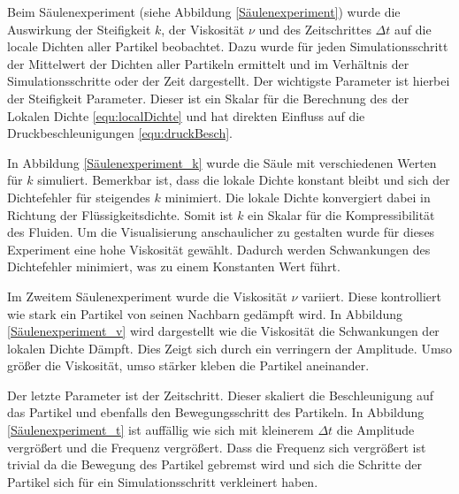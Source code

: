 \documentclass[a4paper, 12pt]{article}
\begin{document}
Beim Säulenexperiment (siehe Abbildung \ref{Säulenexperiment}) wurde die Auswirkung der Steifigkeit $k$, der Viskosität $\nu$ und des Zeitschrittes $\Delta t$ auf die locale Dichten aller Partikel beobachtet. Dazu wurde für jeden Simulationsschritt der Mittelwert der Dichten aller Partikeln ermittelt und im Verhältnis der Simulationsschritte oder der Zeit dargestellt. Der wichtigste Parameter ist hierbei der Steifigkeit Parameter. Dieser ist ein Skalar für die Berechnung des der Lokalen Dichte \eqref{equ:localDichte} und hat direkten Einfluss auf die Druckbeschleunigungen \eqref{equ:druckBesch}. 

In Abbildung \ref{Säulenexperiment_k} wurde die Säule mit verschiedenen Werten für $k$ simuliert. Bemerkbar ist, dass die lokale Dichte konstant bleibt und sich der Dichtefehler für steigendes $k$ minimiert. Die lokale Dichte konvergiert dabei in Richtung der Flüssigkeitsdichte. Somit ist $k$ ein Skalar für die Kompressibilität des Fluiden.
Um die Visualisierung anschaulicher zu gestalten wurde für dieses Experiment eine hohe Viskosität gewählt. Dadurch werden Schwankungen des Dichtefehler minimiert, was zu einem Konstanten Wert führt. 

Im Zweitem Säulenexperiment wurde die Viskosität $\nu$ variiert. Diese kontrolliert wie stark ein Partikel von seinen Nachbarn gedämpft wird. In Abbildung \ref{Säulenexperiment_v} wird dargestellt wie die Viskosität die Schwankungen der lokalen Dichte Dämpft. Dies Zeigt sich durch ein verringern der Amplitude. Umso größer die Viskosität, umso stärker kleben die Partikel aneinander. 

Der letzte Parameter ist der Zeitschritt. Dieser skaliert die Beschleunigung auf das Partikel und ebenfalls den Bewegungsschritt des Partikeln. In Abbildung \ref{Säulenexperiment_t} ist auffällig wie sich mit kleinerem $\Delta t$ die Amplitude vergrößert und die Frequenz vergrößert. Dass die Frequenz sich vergrößert ist trivial da die Bewegung des Partikel gebremst wird und sich die Schritte der Partikel sich für ein Simulationsschritt verkleinert haben. 
\end{document}
